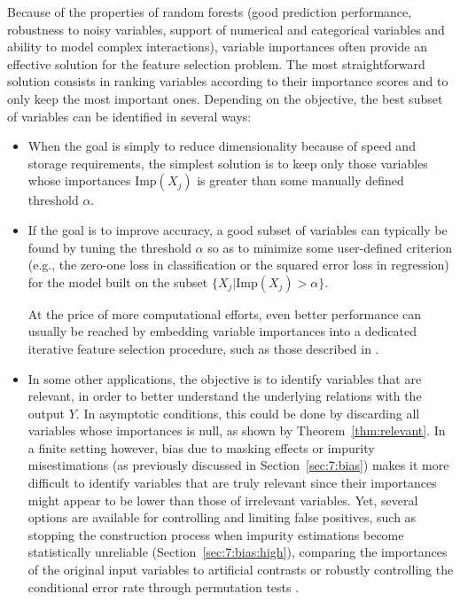 Because of the properties of random forests (good prediction performance,
robustness to noisy variables, support of numerical and categorical
variables and ability to model complex interactions), variable importances
often provide an effective solution for the feature selection problem. The
most straightforward solution consists in ranking variables according to
their importance scores and to only keep the most important ones. Depending
on the objective, the best subset of variables can be identified in
several ways:

\begin{itemize}
\item  When the goal is simply to reduce dimensionality because of speed
       and storage requirements, the simplest solution
       is to keep only those variables whose importances $\text{Imp}(X_j)$
       is greater than some manually defined threshold $\alpha$.

\item If the goal is to improve accuracy, a good subset
      of variables can typically be found by tuning the threshold $\alpha$ so
      as to minimize some user-defined criterion (e.g., the zero-one loss in
      classification or the squared error loss in regression) for the model
      built on the subset $\{X_j | \text{Imp}(X_j) > \alpha \}$.

      At the price of more computational efforts, even better performance can
      usually be reached by embedding variable importances into a dedicated
      iterative feature selection procedure, such as those described in
      \citep{guyon:2002,tuv:2009}.

\item In some other applications, the objective is to identify variables
      that are relevant, in order to better understand the underlying relations
      with the output $Y$. In asymptotic conditions, this could be done by
      discarding all variables whose importances is null, as shown by
      Theorem~\ref{thm:relevant}. In a finite setting however, bias due to
      masking effects or impurity misestimations (as previously discussed in
      Section~\ref{sec:7:bias}) makes it more difficult to identify variables
      that are truly relevant since their importances might appear to be lower
      than those of irrelevant variables. Yet, several options are available
      for controlling and limiting false positives, such as stopping the
      construction process when impurity estimations become statistically
      unreliable (Section~\ref{sec:7:bias:high}), comparing the importances of
      the original input variables to artificial contrasts \citep{tuv:2006} or
      robustly controlling the conditional error rate through permutation tests
      \citep{saeys:2012}.

\end{itemize}


